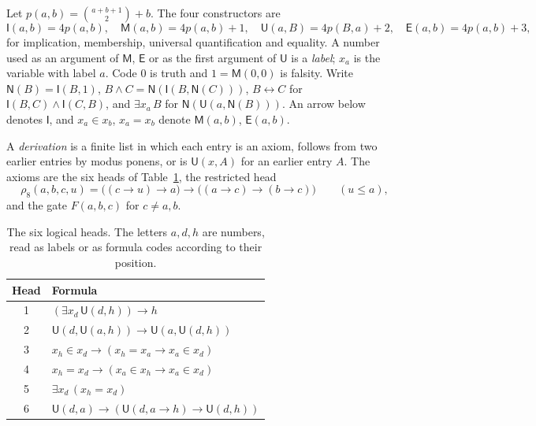 \documentclass[11pt,letterpaper]{article}
\newcommand{\Ic}{\mathsf{I}}
\newcommand{\Mc}{\mathsf{M}}
\newcommand{\Uc}{\mathsf{U}}
\newcommand{\Ec}{\mathsf{E}}
\newcommand{\Nc}{\mathsf{N}}
\begin{document}
Let $p(a,b)=\binom{a+b+1}{2}+b$. The four constructors are
\[
 \Ic(a,b)=4p(a,b),\quad \Mc(a,b)=4p(a,b)+1,\quad
 \Uc(a,B)=4p(B,a)+2,\quad \Ec(a,b)=4p(a,b)+3,
\]
for implication, membership, universal quantification and equality.
A number used as an argument of $\Mc$, $\Ec$ or as the first argument of
$\Uc$ is a \emph{label}; $x_a$ is the variable with label $a$. Code $0$ is
truth and $1=\Mc(0,0)$ is falsity. Write $\Nc(B)=\Ic(B,1)$,
$B\wedge C=\Nc(\Ic(B,\Nc(C)))$, $B\leftrightarrow C$ for
$\Ic(B,C)\wedge\Ic(C,B)$, and $\exists x_a\,B$ for $\Nc(\Uc(a,\Nc(B)))$.
An arrow below denotes $\Ic$, and $x_a\in x_b$, $x_a=x_b$ denote
$\Mc(a,b)$, $\Ec(a,b)$.

A \emph{derivation} is a finite list in which each entry is an axiom, follows
from two earlier entries by modus ponens, or is $\Uc(x,A)$ for an earlier
entry $A$. The axioms are the six heads of Table~\ref{tab:heads}, the
restricted head
\[
 \rho_8(a,b,c,u)=\bigl((c\to u)\to a\bigr)\to\bigl((a\to c)\to(b\to c)\bigr)
 \qquad(u\le a),
\]
and the gate $F(a,b,c)$ for $c\ne a,b$.

\begin{table}[ht]
\centering\small
\begin{tabular}{@{}cl@{}}
\toprule
Head & Formula \\
\midrule
1 & $(\exists x_d\,\Uc(d,h))\to h$ \\
2 & $\Uc(d,\Uc(a,h))\to\Uc(a,\Uc(d,h))$ \\
3 & $x_h\in x_d\to(x_h=x_a\to x_a\in x_d)$ \\
4 & $x_h=x_d\to(x_a\in x_h\to x_a\in x_d)$ \\
5 & $\exists x_d\,(x_h=x_d)$ \\
6 & $\Uc(d,a)\to(\Uc(d,a\to h)\to\Uc(d,h))$ \\
\bottomrule
\end{tabular}
\caption{The six logical heads. The letters $a,d,h$ are numbers, read
as labels or as formula codes according to their position.}\label{tab:heads}
\end{table}
\end{document}

